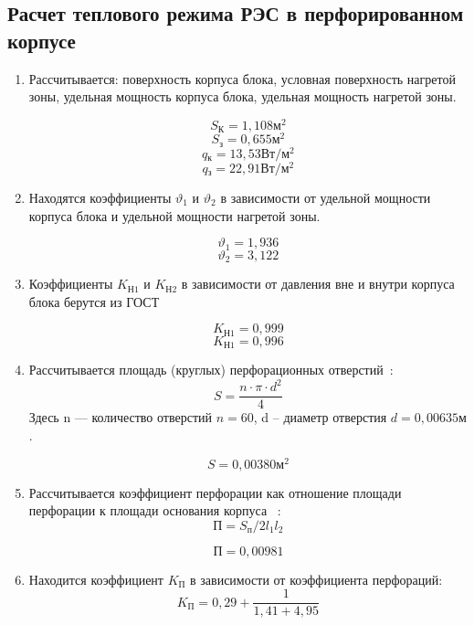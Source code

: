 \subsection{Расчет теплового режима РЭС в перфорированном корпусе}

\begin{enumerate}[label={\arabic*.}]

\item Рассчитывается:
  поверхность корпуса блока,
  условная поверхность нагретой зоны,
  удельная мощность корпуса блока,
  удельная мощность нагретой зоны.

  $$S\mathrm{_{К}}=1,108\mathrm{м^2}$$
  $$S\mathrm{_{з}} = 0,655 \mathrm{м^2}$$
  $$q\mathrm{_к} = 13,53\mathrm{Вт/м^2}$$
  $$q\mathrm{_з} = 22,91 \mathrm{ Вт/м^2}$$

\item Находятся коэффициенты $\vartheta_1$ и
  $\vartheta_2$ в зависимости от
  удельной мощности корпуса блока и
  удельной мощности нагретой зоны.

  $$\vartheta_1=1,936$$
  $$\vartheta_2=3,122$$


\item Коэффициенты $K\mathrm{_{Н1}}$ и $K\mathrm{_{Н2}}$
  в зависимости от давления вне и
  внутри корпуса блока берутся из ГОСТ

  $$K\mathrm{_{Н1}} = 0,999$$
  $$K\mathrm{_{Н1}} = 0,996$$

\item Рассчитывается площадь (круглых)
  перфорационных отверстий~\cite{Rotkop1976}:
  \begin{equation}
    S = \frac{n \cdot \pi \cdot d^2}{4}
    \end{equation}
    Здесь n — количество отверстий $n = 60$,
    d – диаметр отверстия $d = 0,00635\mathrm{м}$.

    $$S = 0,00380\mathrm{м^2}$$

\item Рассчитывается коэффициент перфорации
    как отношение площади перфорации к
    площади основания корпуса ~\cite{Rotkop1976}:
    \begin{equation}
    \mathrm{П} = S\mathrm{_п}/2 l_1 l_2
  \end{equation}

  $$\mathrm{П} = 0,00981$$

\item Находится коэффициент $K\mathrm{_П}$ в зависимости от
  коэффициента перфораций:
  \begin{equation}
    K\mathrm{_П} = 0,29 + \frac{1}{1,41 + 4,95}
  \end{equation}
 

\end{enumerate}
